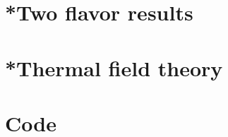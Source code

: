 \documentclass[10pt, a4paper]{book}
\begin{document}
    \chapter[Appendix A]{}
    \label{appendix: A}
    
    
    
    
    

    \chapter{*Two flavor results}
    \label{appendix: two flavor results}
    
    
    
    
    \chapter{*Thermal field theory}
    \label{appendix: thermal field theory}
    
    
    
    
    
    
    
    \chapter{Code}
    

    \cleardoublepage
    \printbibliography
\end{document}
